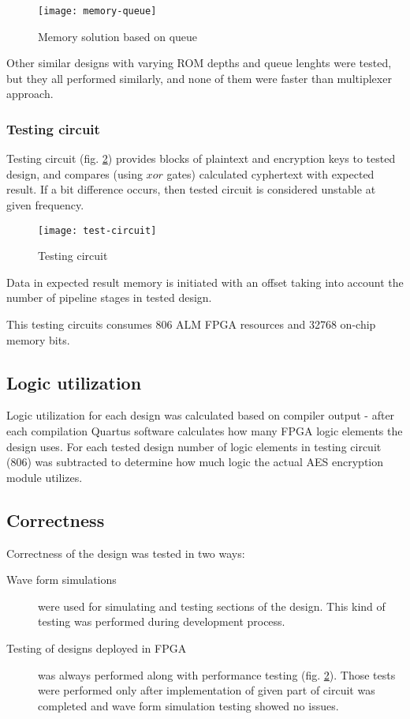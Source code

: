 \begin{figure}[!h]
\centering
\texttt{[image: memory-queue]}
\caption{Memory solution based on queue}
\label{fig:memory-queue}
\end{figure}

Other similar designs with varying ROM depths and queue lenghts were tested, but they all performed similarly, and none of them were faster than multiplexer approach.


\subsubsection{Testing circuit}
Testing circuit (fig. \ref{fig:test-circuit}) provides blocks of plaintext and encryption keys to tested design, and compares (using $xor$ gates) calculated cyphertext with expected result. If a bit difference occurs, then tested circuit is considered unstable at given frequency.

\begin{figure}[!h]
\centering
\texttt{[image: test-circuit]}
\caption{Testing circuit}
\label{fig:test-circuit}
\end{figure}

Data in expected result memory is initiated with an offset taking into account the number of pipeline stages in tested design.

This testing circuits consumes 806 ALM FPGA resources and 32768 on-chip memory bits.



\subsection{Logic utilization}
Logic utilization for each design was calculated based on compiler output - after each compilation Quartus software calculates how many FPGA logic elements the design uses. For each tested design number of logic elements in testing circuit (806) was subtracted to determine how much logic the actual AES encryption module utilizes.



\subsection{Correctness}
Correctness of the design was tested in two ways:
\begin{description}
\item[Wave form simulations] were used for simulating and testing sections of the design. This kind of testing was performed during development process.
\item[Testing of designs deployed in FPGA] was always performed along with performance testing (fig. \ref{fig:test-circuit}). Those tests were performed only after implementation of given part of circuit was completed and wave form simulation testing showed no issues.
\end{description}

